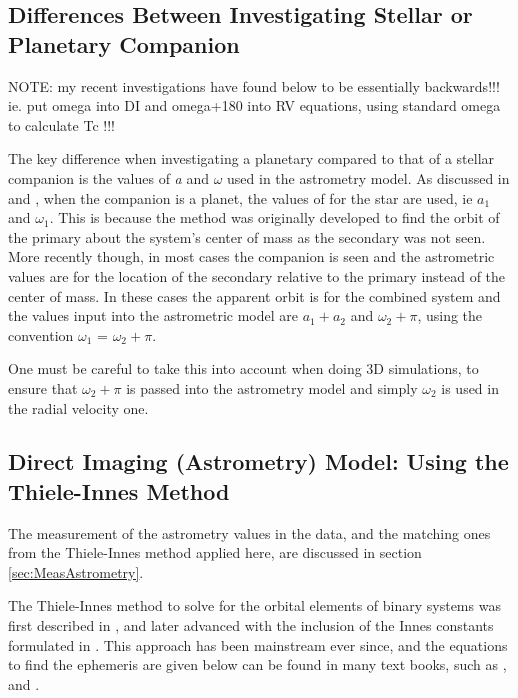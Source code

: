 \documentclass[12pt,preprint]{aastex}
\begin{document}
\subsection{Differences Between Investigating Stellar or Planetary Companion}\label{sec:omegaIssues}

NOTE: my recent investigations have found below to be essentially backwards!!! ie. put omega into DI and omega+180 into RV equations, using standard omega to calculate Tc !!!

The key difference when investigating a planetary compared to that of a stellar companion is the values of {\it a} and $\omega$ used in the astrometry model.  As discussed in \citet{Shulze-Hartung} and \citet{wright2009}, when the companion is a planet, the values of for the star are used, ie $a_1$ and $\omega_1$.  This is because the method was originally developed to find the orbit of the primary about the system's center of mass as the secondary was not seen.  More recently though, in most cases the companion is seen and the astrometric values are for the location of the secondary relative to the primary instead of the center of mass.  In these cases the apparent orbit is for the combined system and the values input into the astrometric model are $a_1+a_2$ and $\omega_2+\pi$, using the convention $\omega_1$ = $\omega_2+\pi$.

One must be careful to take this into account when doing 3D simulations, to ensure that $\omega_2+\pi$ is passed into the astrometry model and simply $\omega_2$ is used in the radial velocity one.

\pagebreak


\subsection{Direct Imaging (Astrometry) Model: Using the Thiele-Innes Method}\label{sec:TH_I} 

The measurement of the astrometry values in the data, and the matching ones from the Thiele-Innes method applied here, are discussed in section \ref{sec:MeasAstrometry}.

The Thiele-Innes method to solve for the orbital elements of binary systems was first described in \citet{Thiele}, and later advanced with the inclusion of the Innes constants formulated in \citet{Van}.  This approach has been mainstream ever since, and the equations to find the ephemeris are given below can be found in many text books, such as \citet{aitken}, \citet{binnendijk} and \citet{heintz}.
\end{document}

